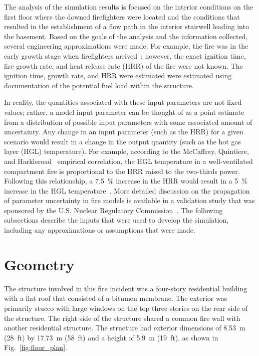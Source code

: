 \documentclass[12pt,oneside]{book}
\begin{document}
The analysis of the simulation results is focused on the interior conditions on the first floor where the downed firefighters were located and the conditions that resulted in the establishment of a flow path in the interior stairwell leading into the basement. Based on the goals of the analysis and the information collected, several engineering approximations were made. For example, the fire was in the early growth stage when firefighters arrived~\cite{NIOSH:Bowyer2}; however, the exact ignition time, fire growth rate, and heat release rate (HRR) of the fire were not known. The ignition time, growth rate, and HRR were estimated were estimated using documentation of the potential fuel load within the structure.

In reality, the quantities associated with these input parameters are not fixed values; rather, a model input parameter can be thought of as a point estimate from a distribution of possible input parameters with some associated amount of uncertainty. Any change in an input parameter (such as the HRR) for a given scenario would result in a change in the output quantity (such as the hot gas layer (HGL) temperature). For example, according to the McCaffrey, Quintiere, and Harkleroad~\cite{SFPE:Walton} empirical correlation, the HGL temperature in a well-ventilated compartment fire is proportional to the HRR raised to the two-thirds power. Following this relationship, a 7.5~\% increase in the HRR would result in a 5~\% increase in the HGL temperature~\cite{NUREG_1824_Sup_1}. More detailed discussion on the propagation of parameter uncertainty in fire models is available in a validation study that was sponsored by the U.S. Nuclear Regulatory Commission~\cite{NUREG_1824_Sup_1}. The following subsections describe the inputs that were used to develop the simulation, including any approximations or assumptions that were made.

\section{Geometry}
\label{sec:geometry}

The structure involved in this fire incident was a four-story residential building with a flat roof that consisted of a bitumen membrane. The exterior was primarily stucco with large windows on the top three stories on the rear side of the structure. The right side of the structure shared a common fire wall with another residential structure. The structure had exterior dimensions of 8.53~m (28~ft) by 17.73~m (58~ft) and a height of 5.9~m (19~ft), as shown in Fig.~\ref{fig:floor_plan}.
\end{document}
